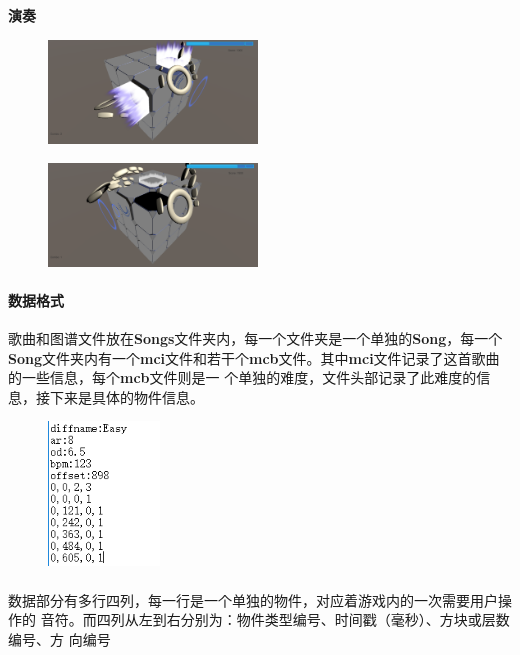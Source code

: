 \documentclass{article}
\begin{document}
\textbf{演奏}
\begin{figure}[H]
  \begin{minipage}{0.5\linewidth}
    \includegraphics[width=15em]{inGame.png}\\
    \caption{}\label{}
  \end{minipage}
  \begin{minipage}{0.5\linewidth}
    \includegraphics[width=15em]{inGame2.png}\\
    \caption{}\label{}
  \end{minipage}
\end{figure}
\paragraph{数据格式}
歌曲和图谱文件放在\textbf{Songs}文件夹内，每一个文件夹是一个单独的\textbf{Song}，每一个\textbf{Song}文件夹内有一个\textbf{mci}文件和若干个\textbf{mcb}文件。其中\textbf{mci}文件记录了这首歌曲的一些信息，每个\textbf{mcb}文件则是一
个单独的难度，文件头部记录了此难度的信息，接下来是具体的物件信息。
\begin{figure}[H]
  \centering
  \includegraphics[width=8em]{mci.png}\\
  \caption{}\label{}
\end{figure}
\paragraph{}
数据部分有多行四列，每一行是一个单独的物件，对应着游戏内的一次需要用户操作的
音符。而四列从左到右分别为：物件类型编号、时间戳（毫秒）、方块或层数编号、方
向编号
\end{document}
